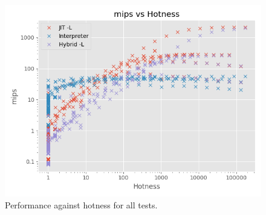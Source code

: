 \begin{figure}[h]
    \centering
    \includegraphics[scale=0.75]{output/graphs/scatter/hotness.png}
    \caption{Performance against hotness for all tests.}
    \label{figure:hotness}
\end{figure}






